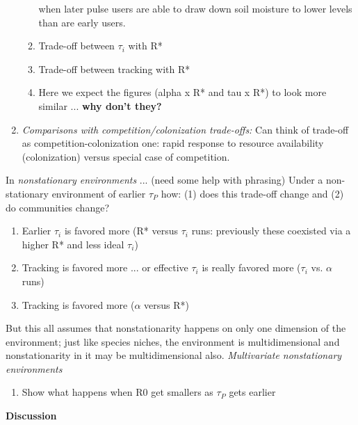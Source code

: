 \documentclass[11pt,letterpaper]{article}
\begin{document}
\begin{enumerate}
\begin{enumerate}
when later pulse users are able to draw down soil moisture to lower levels than are early users.
\item Trade-off between $\tau_i$ with R*
\item Trade-off between tracking with R*
\item Here we expect the figures (alpha x R* and tau x R*) to look more similar ... {\bf why don't they?}
\end{enumerate}
\item \emph{Comparisons with competition/colonization trade-offs:} Can think of trade-off as competition-colonization one: rapid response to resource availability (colonization) versus special case of competition.\\
\end{enumerate}
\item In \emph{nonstationary environments} ... (need some help with phrasing)
Under a non-stationary environment of earlier $\tau_P$ how: (1) does this trade-off change and (2) do communities change?
\begin{enumerate}
\item Earlier $\tau_i$ is favored more (R* versus $\tau_i$ runs: previously these coexisted via a higher R* and less ideal $\tau_i$)
\item Tracking is favored more ... or effective $\tau_i$ is really favored more ($\tau_i$ vs. $\alpha$ runs)
\item Tracking is favored more ($\alpha$ versus R*)
\end{enumerate}
\item But this all assumes that nonstationarity happens on only one dimension of the environment; just like species niches, the environment is multidimensional and nonstationarity in it may be multidimensional also. \emph{Multivariate nonstationary environments}
\begin{enumerate}
\item Show what happens when R0 get smallers as $\tau_{P}$ gets earlier
\end{enumerate}
\item {\bf Discussion}
\end{document}
